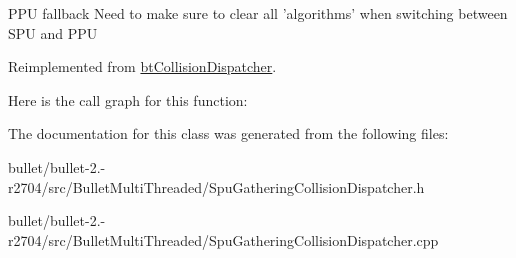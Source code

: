 P\+P\+U fallback Need to make sure to clear all 'algorithms' when switching between S\+P\+U and P\+P\+U 

Reimplemented from \hyperlink{classbt_collision_dispatcher}{bt\+Collision\+Dispatcher}.



Here is the call graph for this function\+:




The documentation for this class was generated from the following files\+:\begin{DoxyCompactItemize}
\item 
bullet/bullet-\/2.-\/r2704/src/\+Bullet\+Multi\+Threaded/Spu\+Gathering\+Collision\+Dispatcher.\+h\item 
bullet/bullet-\/2.-\/r2704/src/\+Bullet\+Multi\+Threaded/Spu\+Gathering\+Collision\+Dispatcher.\+cpp\end{DoxyCompactItemize}
